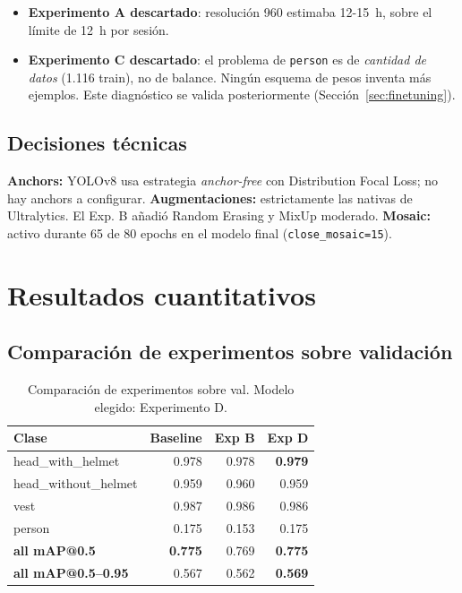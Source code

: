 \documentclass[conference]{IEEEtran}
\begin{document}
\begin{itemize}
    \item \textbf{Experimento A descartado}: resolución 960 estimaba
    12-15~h, sobre el límite de 12~h por sesión.
    \item \textbf{Experimento C descartado}: el problema de
    \texttt{person} es de \emph{cantidad de datos} (1.116 train),
    no de balance. Ningún esquema de pesos inventa más ejemplos.
    Este diagnóstico se valida posteriormente
    (Sección~\ref{sec:finetuning}).
\end{itemize}

\subsection{Decisiones técnicas}

\textbf{Anchors:} YOLOv8 usa estrategia \emph{anchor-free} con
Distribution Focal Loss; no hay anchors a configurar.
\textbf{Augmentaciones:} estrictamente las nativas de Ultralytics.
El Exp. B añadió Random Erasing y MixUp moderado.
\textbf{Mosaic:} activo durante 65 de 80 epochs en el modelo final
(\texttt{close\_mosaic=15}).

\section{Resultados cuantitativos}

\subsection{Comparación de experimentos sobre validación}

\begin{table}[h]
\centering
\caption{Comparación de experimentos sobre val. Modelo elegido:
Experimento D.}
\label{tab:cmp_val}
\renewcommand{\arraystretch}{1.15}
\begin{tabular}{l rrr}
\toprule
\textbf{Clase} & \textbf{Baseline} & \textbf{Exp B} & \textbf{Exp D} \\
\midrule
head\_with\_helmet & 0.978 & 0.978 & \textbf{0.979} \\
head\_without\_helmet & 0.959 & 0.960 & 0.959 \\
vest & 0.987 & 0.986 & 0.986 \\
person & 0.175 & 0.153 & 0.175 \\
\midrule
\textbf{all mAP@0.5} & \textbf{0.775} & 0.769 & \textbf{0.775} \\
\textbf{all mAP@0.5--0.95} & 0.567 & 0.562 & \textbf{0.569} \\
\bottomrule
\end{tabular}
\end{table}
\end{document}
